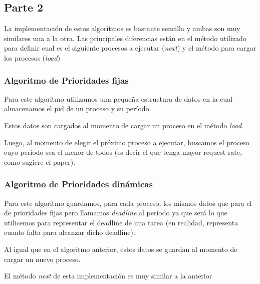 \documentclass[a4paper,11pt]{article}
\begin{document}
	
\subsection{Parte 2}
	La implementación de estos algoritmos es bastante sencilla y ambas son muy similares una a la otra. Las principales diferencias están en el método utilizado para definir cual es el siguiente procesos a ejecutar (\emph{next}) y el método para cargar los procesos (\emph{load})

	\subsubsection{Algoritmo de Prioridades fijas}
	Para este algoritmo utilizamos una pequeña estructura de datos en la cual almacenamos el pid de un proceso y su período.
	
	

\pagebreak		

	Estos datos son cargados al momento de cargar un proceso en el método \emph{load}.
	

	Luego, al momento de elegir el próximo proceso a ejecutar, buscamos el proceso cuyo período sea el menor de todos (es decir el que tenga mayor request rate, como sugiere el paper).
	

	\subsubsection{Algoritmo de Prioridades dinámicas}
	Para este algoritmo guardamos, para cada proceso, los mismos datos que para el de prioridades fijas pero llamamos \textit{deadline} al período ya que será lo que utilicemos para representar el deadline de una tarea (en realidad, representa cuanto falta para alcanzar dicho deadline).
	

	Al igual que en el algoritmo anterior, estos datos se guardan al momento de cargar un nuevo proceso.
	

	El método \emph{next} de esta implementación es muy similar a la anterior
	
	
\end{document}
